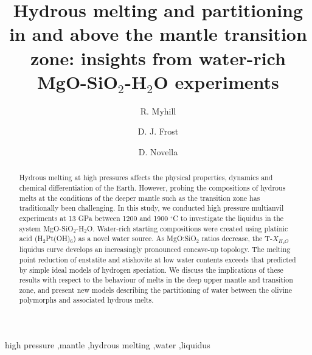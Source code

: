 \documentclass[review]{elsarticle}
\begin{document}
\begin{frontmatter}

\title{Hydrous melting and partitioning in and above the mantle transition zone: insights from water-rich MgO-SiO$_2$-H$_2$O experiments}

\author{R. Myhill}
\address{Bayerisches Geoinstitut, Universit\"{a}t Bayreuth, Universit\"{a}tsstrasse 30, 95447 Bayreuth, Germany \\ Now at School of Earth Sciences, University of Bristol, Wills Memorial Building, Queens Road, Bristol BS8 1RJ, United Kingdom}

\author{D. J. Frost}
\address{Bayerisches Geoinstitut, Universit\"{a}t Bayreuth, Universit\"{a}tsstrasse 30, 95447 Bayreuth, Germany}

\author{D. Novella}
\address{Laboratoire Magmas et Volcans, Universit\'{e} Blaise Pascal, 5 Rue Kessler, 63038 Clermond-Ferrand, France}




\begin{abstract}
Hydrous melting at high pressures affects the physical properties, dynamics and chemical differentiation of the Earth. However, probing the compositions of hydrous melts at the conditions of the deeper mantle such as the transition zone has traditionally been challenging. In this study, we conducted high pressure multianvil experiments at 13 GPa between 1200 and 1900 $^{\circ}$C to investigate the liquidus in the system MgO-SiO$_2$-H$_2$O. Water-rich starting compositions were created using platinic acid (H$_2$Pt(OH)$_6$) as a novel water source. As MgO:SiO$_2$ ratios decrease, the T-$X_{H_2O}$ liquidus curve develops an increasingly pronounced concave-up topology. The melting point reduction of enstatite and stishovite at low water contents exceeds that predicted by simple ideal models of hydrogen speciation. We discuss the implications of these results with respect to the behaviour of melts in the deep upper mantle and transition zone, and present new models describing the partitioning of water between the olivine polymorphs and associated hydrous melts. 
\end{abstract}

\begin{keyword}
high pressure \sep mantle \sep hydrous melting \sep water \sep liquidus
\end{keyword}

\end{frontmatter}
\end{document}
